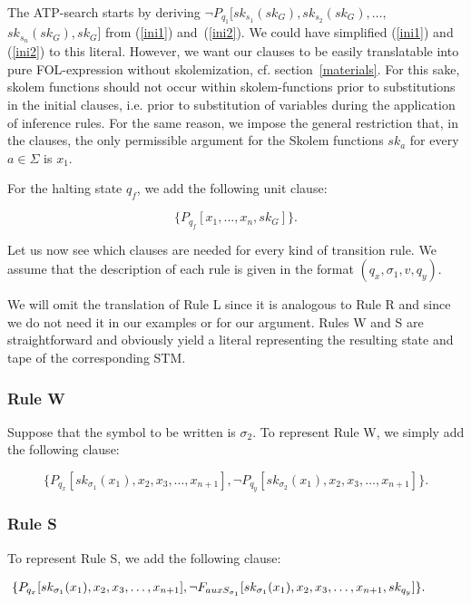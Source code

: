\documentclass[%
  manuscript=article,   %
  year=2024,
  volume=77,
  doi=10.59203/zfn.77.694,
]{zfn}
\begin{document}
The ATP-search starts by deriving $\neg P_{q_1}[sk_{s_1}(sk_G),sk_{s_2}(sk_G), \ldots,$ $sk_{s_n}(sk_G), sk_G]$ from (\ref{ini1}) and~(\ref{ini2}). We could have simplified (\ref{ini1}) and (\ref{ini2}) to this literal. However, we want our clauses to be easily translatable into pure FOL-expression without skolemization, cf. section~\ref{materials}. For this sake, skolem functions should not occur within skolem-functions prior to substitutions in the initial clauses, i.e. prior to substitution of variables during the application of inference rules. For the same reason,  we impose the general restriction that, in the clauses, the only permissible argument for the Skolem functions $sk_a$ for every $a \in \Sigma$ is $x_1$. \label{x1rest}

For the halting state $q_f$, we add the following unit clause:

\begin{equation}
\{P_{q_f}[x_1, ..., x_n, sk_G]\}.
\end{equation}

Let us now see which clauses are needed for every kind of transition rule. We assume that the description of each rule is given in the format $(q_x, \sigma_1, v, q_y)$.

We will omit the translation of Rule L since it is analogous to Rule R and since we do not need it in our examples or for our argument. Rules W and S are straightforward and obviously yield a literal representing the resulting state and tape of the corresponding STM.

\subsubsection{Rule W}

Suppose that the symbol to be written is $\sigma_2$. To represent Rule W, we simply add the following clause:

\begin{equation}
 \{P_{q_x}[sk_{\sigma_1}(x_1), x_2, x_3, \ldots, x_{n+1}],
 \neg P_{q_y}[sk_{\sigma_2}(x_1), x_2, x_3, \ldots, x_{n+1}]\}.
\end{equation}

\subsubsection{Rule S}

To represent Rule S, we add the following clause:

\begin{small}
\begin{equation}
\hspace{-0.95cm} \{P_{q_x}[sk_{\sigma_1}(x_1), x_2, x_3, \ldots, x_{n+1}],
 \neg F_{auxS_{\sigma_1}}[sk_{\sigma_1}(x_1), x_2, x_3, \ldots, x_{n+1}, sk_{q_y}]\}.
\end{equation}
\end{small}
\end{document}
